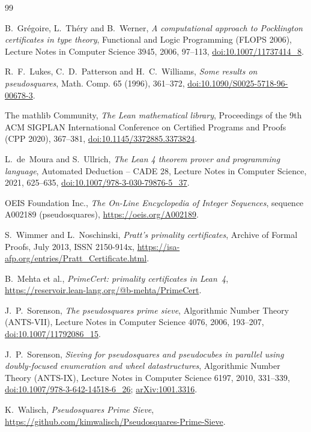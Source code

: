 \documentclass[11pt]{amsart}
\theoremstyle{definition}
\begin{document}
\begin{thebibliography}{99}

B.~Gr\'egoire, L.~Th\'ery and B.~Werner,
\emph{A computational approach to Pocklington certificates in type theory},
Functional and Logic Programming (FLOPS 2006), Lecture Notes in Computer Science 3945, 2006, 97--113,
\href{https://doi.org/10.1007/11737414_8}{doi:10.1007/11737414\_8}.

R.~F.~Lukes, C.~D.~Patterson and H.~C.~Williams,
\emph{Some results on pseudosquares},
Math. Comp. 65 (1996), 361--372,
\href{https://doi.org/10.1090/S0025-5718-96-00678-3}{doi:10.1090/S0025-5718-96-00678-3}.

The mathlib Community,
\emph{The Lean mathematical library},
Proceedings of the 9th ACM SIGPLAN International Conference on Certified Programs and Proofs
(CPP 2020), 367--381,
\href{https://doi.org/10.1145/3372885.3373824}{doi:10.1145/3372885.3373824}.

L.~de~Moura and S.~Ullrich,
\emph{The Lean 4 theorem prover and programming language},
Automated Deduction -- CADE 28, Lecture Notes in Computer Science, 2021, 625--635,
\href{https://doi.org/10.1007/978-3-030-79876-5_37}{doi:10.1007/978-3-030-79876-5\_37}.

OEIS Foundation Inc.,
\emph{The On-Line Encyclopedia of Integer Sequences}, sequence A002189 (pseudosquares),
\url{https://oeis.org/A002189}.

S.~Wimmer and L.~Noschinski,
\emph{Pratt's primality certificates},
Archive of Formal Proofs, July 2013, ISSN 2150-914x,
\url{https://isa-afp.org/entries/Pratt_Certificate.html}.

B.~Mehta et al.,
\emph{PrimeCert: primality certificates in Lean~4},
\url{https://reservoir.lean-lang.org/@b-mehta/PrimeCert}.

J.~P.~Sorenson,
\emph{The pseudosquares prime sieve},
Algorithmic Number Theory (ANTS-VII), Lecture Notes in Computer Science 4076, 2006, 193--207,
\href{https://doi.org/10.1007/11792086_15}{doi:10.1007/11792086\_15}.

J.~P.~Sorenson,
\emph{Sieving for pseudosquares and pseudocubes in parallel using doubly-focused enumeration and
wheel datastructures},
Algorithmic Number Theory (ANTS-IX), Lecture Notes in Computer Science 6197, 2010, 331--339,
\href{https://doi.org/10.1007/978-3-642-14518-6_26}{doi:10.1007/978-3-642-14518-6\_26};
\href{https://arxiv.org/abs/1001.3316}{arXiv:1001.3316}.

K.~Walisch,
\emph{Pseudosquares Prime Sieve},
\url{https://github.com/kimwalisch/Pseudosquares-Prime-Sieve}.

\end{thebibliography}
\end{document}
